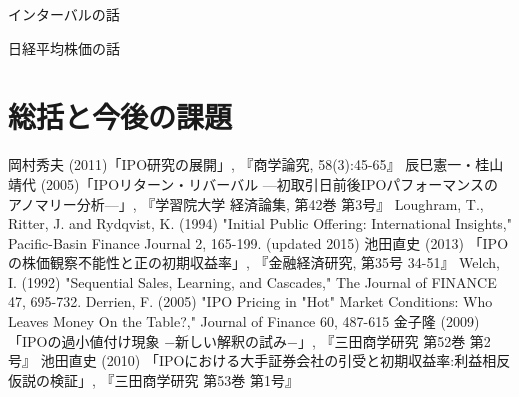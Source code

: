 \documentclass{jsarticle}
\begin{document}
インターバルの話\par
日経平均株価の話\par

\section{総括と今後の課題}

\newpage


\begin{thebibliography}{99}
 岡村秀夫 (2011)「IPO研究の展開」, 『商学論究, 58(3):45-65』
 辰巳憲一・桂山靖代 (2005)「IPOリターン・リバーバル —初取引日前後IPOパフォーマンスのアノマリー分析—」, 『学習院大学 経済論集, 第42巻 第3号』
 Loughram, T., Ritter, J. and Rydqvist, K. (1994) "Initial Public Offering: International Insights," Pacific-Basin Finance Journal 2, 165-199. (updated 2015)
 池田直史 (2013) 「IPOの株価観察不能性と正の初期収益率」, 『金融経済研究, 第35号 34-51』
 Welch, I. (1992) "Sequential Sales, Learning, and Cascades," The Journal of FINANCE 47, 695-732.
 Derrien, F. (2005) "IPO Pricing in "Hot" Market Conditions: Who Leaves Money On the Table?," Journal of Finance 60, 487-615
 金子隆 (2009) 「IPOの過小値付け現象 −新しい解釈の試み−」, 『三田商学研究 第52巻 第2号』
 池田直史 (2010) 「IPOにおける大手証券会社の引受と初期収益率:利益相反仮説の検証」, 『三田商学研究 第53巻 第1号』
\end{thebibliography}
\end{document}
